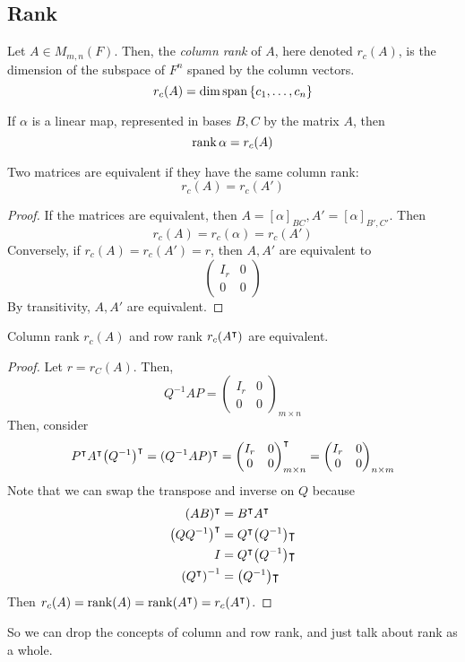 \subsection{Rank}
\begin{definition}
	Let \( A \in M_{m,n}(F) \).
	Then, the \textit{column rank} of \( A \), here denoted \( r_c(A) \), is the dimension of the subspace of \( F^n \) spaned by the column vectors.
	\[
		r_c(A) = \dim \operatorname{span} \qty{c_1, \dots, c_n}
	\]
\end{definition}
\begin{remark}
	If \( \alpha \) is a linear map, represented in bases \( B, C \) by the matrix \( A \), then
	\[
		\rank \alpha = r_c(A)
	\]
\end{remark}
\begin{proposition}
	Two matrices are equivalent if they have the same column rank:
	\[
		r_c(A) = r_c(A')
	\]
\end{proposition}
\begin{proof}
	If the matrices are equivalent, then \( A = [\alpha]_{BC}, A' = [\alpha]_{B',C'} \).
	Then
	\[
		r_c(A) = r_c(\alpha) = r_c(A')
	\]
	Conversely, if \( r_c(A) = r_c(A') = r \), then \( A, A' \) are equivalent to
	\[
		\begin{pmatrix}
			I_r & 0 \\
			0   & 0
		\end{pmatrix}
	\]
	By transitivity, \( A, A' \) are equivalent.
\end{proof}
\begin{theorem}
	Column rank \( r_c(A) \) and row rank \( r_c(A^\intercal) \) are equivalent.
\end{theorem}
\begin{proof}
	Let \( r = r_C(A) \).
	Then,
	\[
		Q^{-1}AP = \begin{pmatrix}
			I_r & 0 \\
			0   & 0
		\end{pmatrix}_{m \times n}
	\]
	Then, consider
	\[
		P^\intercal A^\intercal \qty(Q^{-1})^\intercal = (Q^{-1}AP)^\intercal = \begin{pmatrix}
			I_r & 0 \\
			0   & 0
		\end{pmatrix}_{m \times n}^\intercal = \begin{pmatrix}
			I_r & 0 \\
			0   & 0
		\end{pmatrix}_{n \times m}
	\]
	Note that we can swap the transpose and inverse on \( Q \) because
	\begin{align*}
		(AB)^\intercal          & = B^\intercal A^\intercal           \\
		\qty(QQ^{-1})^\intercal & = Q^\intercal \qty(Q^{-1})\intercal \\
		I                        & = Q^\intercal \qty(Q^{-1})\intercal \\
		\qty(Q^\intercal)^{-1}  & = \qty(Q^{-1})\intercal
	\end{align*}
	Then \( r_c(A) = \rank(A) = \rank(A^\intercal) = r_c(A^\intercal) \).
\end{proof}
\noindent So we can drop the concepts of column and row rank, and just talk about rank as a whole.

